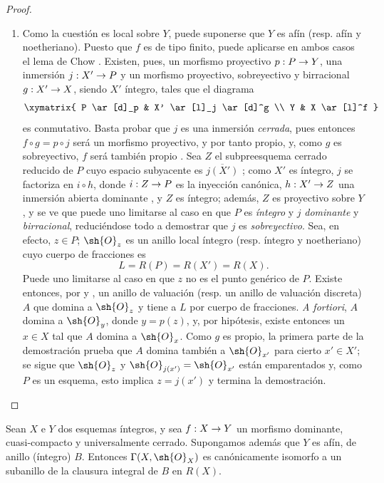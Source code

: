 \documentclass[oneside,10pt]{amsart}
\makeatletter
\newcommand{\ega@arrow}[2]{\mathchoice{#1}{#2}{#2}{#2}}
\renewcommand{\to}{\ega@arrow{\longrightarrow}{\rightarrow}}
\newcommand{\oldpage}[2][]{\marginnote{\normalfont\footnotesize\textbf{#1}~|~#2}\ignorespaces}
\let\EGAOriginalLabel\label
\renewcommand{\label}[1]{\phantomsection\EGAOriginalLabel{#1}}
\makeatother
\begin{document}
\begin{proof}
\begin{enumerate}
  \item[\rm{(ii)}] Como la cuestión es local sobre $Y$, puede suponerse que $Y$ es afín (resp. afín y noetheriano).
  Puesto que $f$ es de tipo finito, puede aplicarse en ambos casos el lema de Chow .
  Existen, pues, un morfismo proyectivo $p:P\to Y$, una inmersión $j:X'\to P$ y un morfismo proyectivo, sobreyectivo y birracional $g:X'\to X$, siendo $X'$ íntegro, tales que el diagrama
  \[
    \xymatrix{
      P \ar[d]_p
      & X' \ar[l]_j \ar[d]^g
      \\ Y
      & X \ar[l]^f
    }
  \]
  es conmutativo.
  Basta probar que $j$ es una inmersión \emph{cerrada}, pues entonces $f\circ g=p\circ j$ será un morfismo proyectivo, y por tanto propio, y, como $g$ es sobreyectivo, $f$ será también propio .
  Sea $Z$ el subpreesquema cerrado reducido de $P$ cuyo espacio subyacente es $\overline{j(X')}$ ;
  como $X'$ es íntegro, $j$ se factoriza en $i\circ h$, donde $i:Z\to P$ es la inyección canónica, $h:X'\to Z$ una inmersión abierta dominante , y $Z$ es íntegro;
\oldpage[II]{147}
  además, $Z$ es proyectivo sobre $Y$, y se ve que puede uno limitarse al caso en que $P$ es \emph{íntegro} y $j$ \emph{dominante} y \emph{birracional}, reduciéndose todo a demostrar que $j$ es \emph{sobreyectivo}.
  Sea, en efecto, $z\in P$;
  $\sh{O}_z$ es un anillo local íntegro (resp. íntegro y noetheriano) cuyo cuerpo de fracciones es
  \[
    L=R(P)=R(X')=R(X).
  \]
  Puede uno limitarse al caso en que $z$ no es el punto genérico de $P$.
  Existe entonces, por  y , un anillo de valuación (resp. un anillo de valuación discreta) $A$ que domina a $\sh{O}_z$ y tiene a $L$ por cuerpo de fracciones.
  \emph{A fortiori}, $A$ domina a $\sh{O}_y$, donde $y=p(z)$, y, por hipótesis, existe entonces un $x\in X$ tal que $A$ domina a $\sh{O}_x$.
  Como $g$ es propio, la primera parte de la demostración prueba que $A$ domina también a $\sh{O}_{x'}$ para cierto $x'\in X'$;
  se sigue que $\sh{O}_z$ y $\sh{O}_{j(x')}=\sh{O}_{x'}$ están emparentados  y, como $P$ es un esquema, esto implica $z=j(x')$  y termina la demostración.
\end{enumerate}
\end{proof}

\begin{corollary}[7.3.11]
\label{II.7.3.11}
Sean $X$ e $Y$ dos esquemas íntegros, y sea $f:X\to Y$ un morfismo dominante, cuasi-compacto y universalmente cerrado.
Supongamos además que $Y$ es afín, de anillo (íntegro) $B$.
Entonces $\Gamma(X,\sh{O}_X)$ es canónicamente isomorfo a un subanillo de la clausura integral de $B$ en $R(X)$.
\end{corollary}
\end{document}
